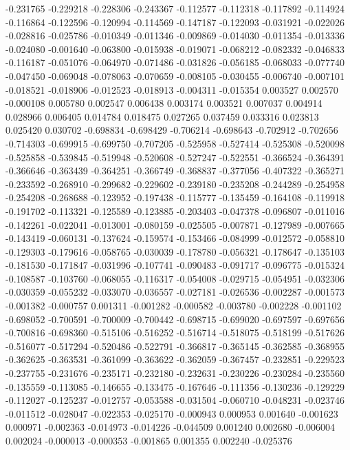 -0.231765
-0.229218
-0.228306
-0.243367
-0.112577
-0.112318
-0.117892
-0.114924
-0.116864
-0.122596
-0.120994
-0.114569
-0.147187
-0.122093
-0.031921
-0.022026
-0.028816
-0.025786
-0.010349
-0.011346
-0.009869
-0.014030
-0.011354
-0.013336
-0.024080
-0.001640
-0.063800
-0.015938
-0.019071
-0.068212
-0.082332
-0.046833
-0.116187
-0.051076
-0.064970
-0.071486
-0.031826
-0.056185
-0.068033
-0.077740
-0.047450
-0.069048
-0.078063
-0.070659
-0.008105
-0.030455
-0.006740
-0.007101
-0.018521
-0.018906
-0.012523
-0.018913
-0.004311
-0.015354
0.003527
0.002570
-0.000108
0.005780
0.002547
0.006438
0.003174
0.003521
0.007037
0.004914
0.028966
0.006405
0.014784
0.018475
0.027265
0.037459
0.033316
0.023813
0.025420
0.030702
-0.698834
-0.698429
-0.706214
-0.698643
-0.702912
-0.702656
-0.714303
-0.699915
-0.699750
-0.707205
-0.525958
-0.527414
-0.525308
-0.520098
-0.525858
-0.539845
-0.519948
-0.520608
-0.527247
-0.522551
-0.366524
-0.364391
-0.366646
-0.363439
-0.364251
-0.366749
-0.368837
-0.377056
-0.407322
-0.365271
-0.233592
-0.268910
-0.299682
-0.229602
-0.239180
-0.235208
-0.244289
-0.254958
-0.254208
-0.268688
-0.123952
-0.197438
-0.115777
-0.135459
-0.164108
-0.119918
-0.191702
-0.113321
-0.125589
-0.123885
-0.203403
-0.047378
-0.096807
-0.011016
-0.142261
-0.022041
-0.013001
-0.080159
-0.025505
-0.007871
-0.127989
-0.007665
-0.143419
-0.060131
-0.137624
-0.159574
-0.153466
-0.084999
-0.012572
-0.058810
-0.129303
-0.179616
-0.058765
-0.030039
-0.178780
-0.056321
-0.178647
-0.135103
-0.181530
-0.171847
-0.031996
-0.107741
-0.090483
-0.091717
-0.096775
-0.015324
-0.108587
-0.103760
-0.068055
-0.116317
-0.054008
-0.029715
-0.054951
-0.032306
-0.030359
-0.055232
-0.033070
-0.036557
-0.027181
-0.026536
-0.002287
-0.001573
-0.001382
-0.000757
0.001311
-0.001282
-0.000582
-0.003780
-0.002228
-0.001102
-0.698052
-0.700591
-0.700009
-0.700442
-0.698715
-0.699020
-0.697597
-0.697656
-0.700816
-0.698360
-0.515106
-0.516252
-0.516714
-0.518075
-0.518199
-0.517626
-0.516077
-0.517294
-0.520486
-0.522791
-0.366817
-0.365145
-0.362585
-0.368955
-0.362625
-0.363531
-0.361099
-0.363622
-0.362059
-0.367457
-0.232851
-0.229523
-0.237755
-0.231676
-0.235171
-0.232180
-0.232631
-0.230226
-0.230284
-0.235560
-0.135559
-0.113085
-0.146655
-0.133475
-0.167646
-0.111356
-0.130236
-0.129229
-0.112027
-0.125237
-0.012757
-0.053588
-0.031504
-0.060710
-0.048231
-0.023746
-0.011512
-0.028047
-0.022353
-0.025170
-0.000943
0.000953
0.001640
-0.001623
0.000971
-0.002363
-0.014973
-0.014226
-0.044509
0.001240
0.002680
-0.006004
0.002024
-0.000013
-0.000353
-0.001865
0.001355
0.002240
-0.025376
